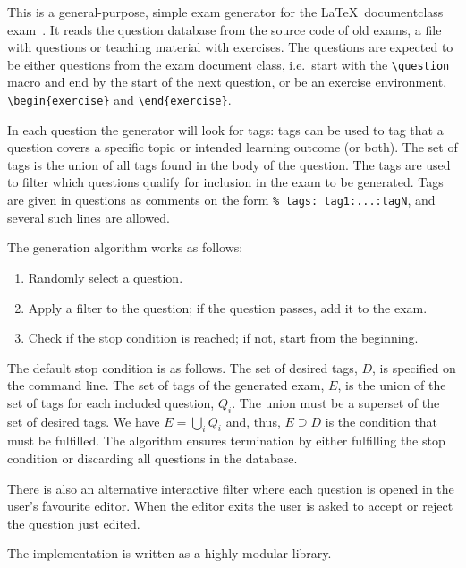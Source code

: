This is a general-purpose, simple exam generator for the \LaTeX\ documentclass 
exam~\cite{exam}.
It reads the question database from the source code of old exams, a file with 
questions or teaching material with exercises.
The questions are expected to be either questions from the exam document class, 
i.e.\ start with the
\verb'\question'
macro and end by the start of the next question, or be an exercise environment,
\verb'\begin{exercise}'
and
\verb'\end{exercise}'.

In each question the generator will look for tags:
tags can be used to tag that a question covers a specific topic or intended 
learning outcome (or both).
The set of tags is the union of all tags found in the body of the question.
The tags are used to filter which questions qualify for inclusion in the exam 
to be generated.
Tags are given in questions as comments on the form
\verb'% tags: tag1:...:tagN',
and several such lines are allowed.

The generation algorithm works as follows:
\begin{enumerate}
\item Randomly select a question.
\item Apply a filter to the question; if the question passes, add it to the 
exam.
\item Check if the stop condition is reached; if not, start from the beginning.
\end{enumerate}
The default stop condition is as follows.
The set of desired tags, \(D\), is specified on the command line.
The set of tags of the generated exam, \(E\), is the union of the set of tags 
for each included question, \(Q_i\).
The union must be a superset of the set of desired tags.
We have \(E = \bigcup_i Q_i\) and, thus, \(E\supseteq D\) is the condition that 
must be fulfilled.
The algorithm ensures termination by either fulfilling the stop condition or 
discarding all questions in the database.

There is also an alternative interactive filter where each question is opened 
in the user's favourite editor.
When the editor exits the user is asked to accept or reject the question just 
edited.

The implementation is written as a highly modular library.
